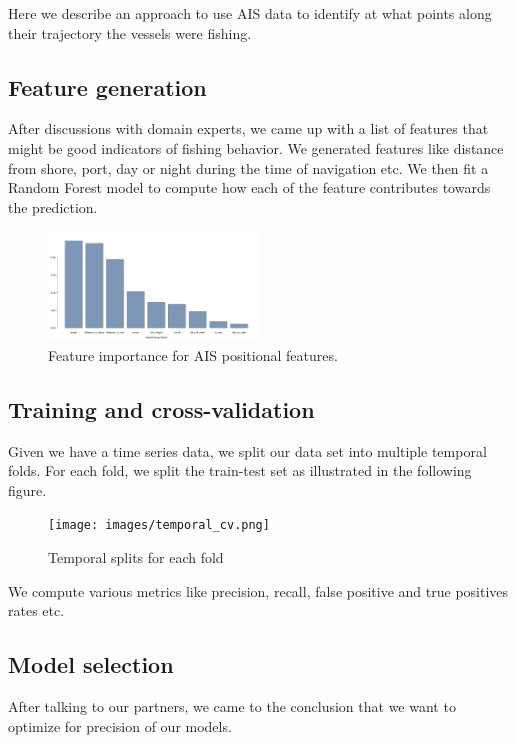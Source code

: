 Here we describe an approach to use AIS data to identify at what points along their trajectory the vessels were fishing.

\subsection{Feature generation}

After discussions with domain experts, we came up with a list of features that might be good indicators of fishing behavior.
We generated features like distance from shore, port, day or night during the time of navigation etc. We then fit a Random Forest model to compute how each of the feature contributes towards the prediction.

\begin{figure}[H]
\centering
\includegraphics[width=0.5\textwidth]{images/feature_importance_final.png}
\caption{\label{fig:Feature importance}Feature importance for AIS positional features.}
\end{figure}

\subsection{Training and cross-validation}

Given we have a time series data, we split our data set into multiple temporal folds. For each fold, we split the train-test set as illustrated in the following figure.

\begin{figure}[H]
\centering
\texttt{[image: images/temporal\_cv.png]}
\caption{\label{fig:Temporal Cross-validation}Temporal splits for each fold}
\end{figure}

We compute various metrics like precision, recall, false positive and true positives rates etc.

\subsection{Model selection}
After talking to our partners, we came to the conclusion that we want to optimize for precision of our models.


